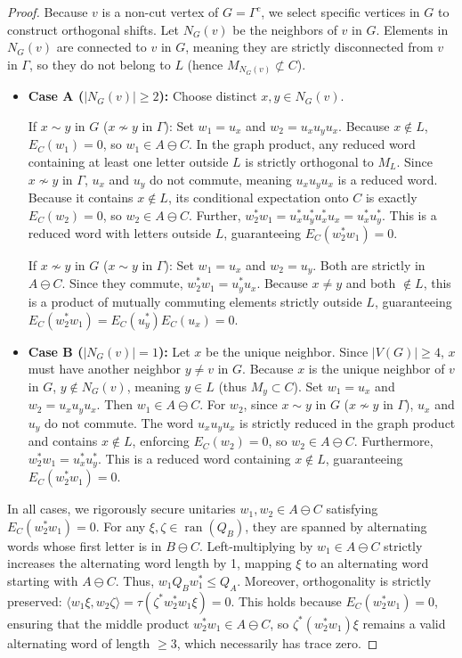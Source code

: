 \begin{proof}
Because $v$ is a non-cut vertex of $G = \Gamma^c$, we select specific vertices in $G$ to construct orthogonal shifts. Let $N_{G}(v)$ be the neighbors of $v$ in $G$. Elements in $N_G(v)$ are connected to $v$ in $G$, meaning they are strictly disconnected from $v$ in $\Gamma$, so they do not belong to $L$ (hence $M_{N_G(v)} \not\subset C$). 
\begin{itemize}
    \item \textbf{Case A ($|N_G(v)| \ge 2$):} Choose distinct $x, y \in N_G(v)$. 
    
  If $x \sim y$ in $G$ ($x \nsim y$ in $\Gamma$): Set $w_1 = u_x$ and $w_2 = u_x u_y u_x$. Because $x \notin L$, $E_C(w_1) = 0$, so $w_1 \in A \ominus C$. In the graph product, any reduced word containing at least one letter outside $L$ is strictly orthogonal to $M_L$. Since $x \nsim y$ in $\Gamma$, $u_x$ and $u_y$ do not commute, meaning $u_x u_y u_x$ is a reduced word. Because it contains $x \notin L$, its conditional expectation onto $C$ is exactly $E_C(w_2) = 0$, so $w_2 \in A \ominus C$. Further, $w_2^* w_1 = u_x^* u_y^* u_x^* u_x = u_x^* u_y^*$. This is a reduced word with letters outside $L$, guaranteeing $E_C(w_2^* w_1) = 0$.
  
  If $x \nsim y$ in $G$ ($x \sim y$ in $\Gamma$): Set $w_1 = u_x$ and $w_2 = u_y$. Both are strictly in $A \ominus C$. Since they commute, $w_2^* w_1 = u_y^* u_x$. Because $x \neq y$ and both $\notin L$, this is a product of mutually commuting elements strictly outside $L$, guaranteeing $E_C(w_2^* w_1) = E_C(u_y^*)E_C(u_x) = 0$.
  
    \item \textbf{Case B ($|N_G(v)| = 1$):} Let $x$ be the unique neighbor. Since $|V(G)| \ge 4$, $x$ must have another neighbor $y \neq v$ in $G$. Because $x$ is the unique neighbor of $v$ in $G$, $y \notin N_G(v)$, meaning $y \in L$ (thus $M_y \subset C$). Set $w_1 = u_x$ and $w_2 = u_x u_y u_x$. Then $w_1 \in A \ominus C$. For $w_2$, since $x \sim y$ in $G$ ($x \nsim y$ in $\Gamma$), $u_x$ and $u_y$ do not commute. The word $u_x u_y u_x$ is strictly reduced in the graph product and contains $x \notin L$, enforcing $E_C(w_2) = 0$, so $w_2 \in A \ominus C$. Furthermore, $w_2^* w_1 = u_x^* u_y^*$. This is a reduced word containing $x \notin L$, guaranteeing $E_C(w_2^* w_1) = 0$.
\end{itemize}

In all cases, we rigorously secure unitaries $w_1, w_2 \in A \ominus C$ satisfying $E_C(w_2^* w_1) = 0$. 
For any $\xi, \zeta \in \operatorname{ran}(Q_B)$, they are spanned by alternating words whose first letter is in $B \ominus C$. Left-multiplying by $w_1 \in A \ominus C$ strictly increases the alternating word length by 1, mapping $\xi$ to an alternating word starting with $A \ominus C$. Thus, $w_1 Q_B w_1^* \le Q_A$. Moreover, orthogonality is strictly preserved: $\langle w_1 \xi, w_2 \zeta \rangle = \tau(\zeta^* w_2^* w_1 \xi) = 0$. This holds because $E_C(w_2^* w_1) = 0$, ensuring that the middle product $w_2^* w_1 \in A \ominus C$, so $\zeta^* (w_2^* w_1) \xi$ remains a valid alternating word of length $\ge 3$, which necessarily has trace zero.


\end{proof}
